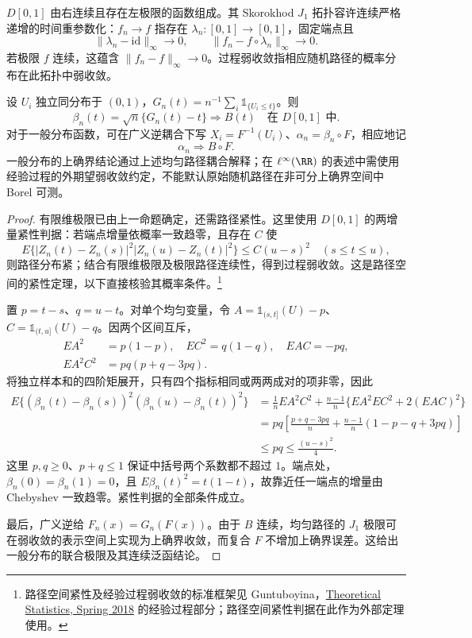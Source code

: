 \begin{definition}[右连续路径空间与过程弱收敛]
$D[0,1]$ 由右连续且存在左极限的函数组成。其 Skorokhod $J_1$ 拓扑容许连续严格递增的时间重参数化：$f_n\to f$ 指存在 $\lambda_n:[0,1]\to[0,1]$，固定端点且
\[
 \|\lambda_n-\mathrm{id}\|_\infty\to0,
 \qquad \|f_n-f\circ\lambda_n\|_\infty\to0.
\]
若极限 $f$ 连续，这蕴含 $\|f_n-f\|_\infty\to0$。过程弱收敛指相应随机路径的概率分布在此拓扑中弱收敛。
\end{definition}

\begin{theorem}
设 $U_i$ 独立同分布于 $(0,1)$，$G_n(t)=n^{-1}\sum_i\mathds{1}_{\{U_i\le t\}}$。则
\[
 \beta_n(t)=\sqrt n\{G_n(t)-t\}\Longrightarrow B(t)
 \quad\text{在 }D[0,1]\text{ 中}.
\]
对于一般分布函数，可在广义逆耦合下写 $X_i=F^{-1}(U_i)$、$\alpha_n=\beta_n\circ F$，相应地记
\begin{equation}\label{eq:math-stat-donsker-cdf}
 \alpha_n\Longrightarrow B\circ F.
\end{equation}
一般分布的上确界结论通过上述均匀路径耦合解释；在 $\ell^\infty(\RR)$ 的表述中需使用经验过程的外期望弱收敛约定，不能默认原始随机路径在非可分上确界空间中 Borel 可测。
\end{theorem}
\begin{proof}
有限维极限已由上一命题确定，还需路径紧性。这里使用 $D[0,1]$ 的两增量紧性判据：若端点增量依概率一致趋零，且存在 $C$ 使
\[
 E\{|Z_n(t)-Z_n(s)|^2|Z_n(u)-Z_n(t)|^2\}
 \le C(u-s)^2\quad(s\le t\le u),
\]
则路径分布紧；结合有限维极限及极限路径连续性，得到过程弱收敛。这是路径空间的紧性定理，以下直接核验其概率条件。\footnote{路径空间紧性及经验过程弱收敛的标准框架见 Guntuboyina，\href{https://www.stat.berkeley.edu/~aditya/resources/FullNotes210BSpring2018.pdf}{Theoretical Statistics, Spring 2018} 的经验过程部分；路径空间紧性判据在此作为外部定理使用。}

置 $p=t-s$、$q=u-t$。对单个均匀变量，令 $A=\mathds{1}_{(s,t]}(U)-p$、$C=\mathds{1}_{(t,u]}(U)-q$。因两个区间互斥，
\begin{align*}
 EA^2&=p(1-p),\quad EC^2=q(1-q),\quad EAC=-pq,\\
 EA^2C^2&=pq(p+q-3pq).
\end{align*}
将独立样本和的四阶矩展开，只有四个指标相同或两两成对的项非零，因此
\begin{align*}
 E\{(\beta_n(t)-\beta_n(s))^2(\beta_n(u)-\beta_n(t))^2\}
 &=\frac1nEA^2C^2+\frac{n-1}{n}\{EA^2EC^2+2(EAC)^2\}\\
 &=pq\left[\frac{p+q-3pq}{n}
 +\frac{n-1}{n}(1-p-q+3pq)\right]\\
 &\le pq\le\frac{(u-s)^2}{4}.
\end{align*}
这里 $p,q\ge0$、$p+q\le1$ 保证中括号两个系数都不超过 $1$。端点处，$\beta_n(0)=\beta_n(1)=0$，且 $E\beta_n(t)^2=t(1-t)$，故靠近任一端点的增量由 Chebyshev 一致趋零。紧性判据的全部条件成立。

最后，广义逆给 $F_n(x)=G_n(F(x))$。由于 $B$ 连续，均匀路径的 $J_1$ 极限可在弱收敛的表示空间上实现为上确界收敛，而复合 $F$ 不增加上确界误差。这给出一般分布的联合极限及其连续泛函结论。
\end{proof}

